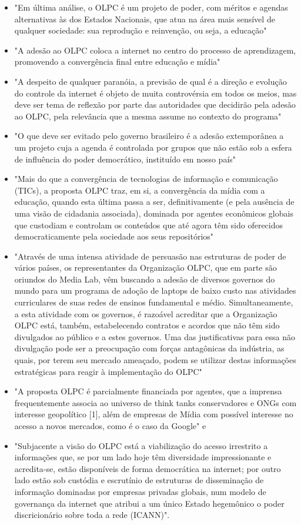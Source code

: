 \begin{itemize}
\item "Em última análise, o OLPC é um projeto de poder, com méritos e agendas alternativas às dos Estados Nacionais, que atua na área mais sensível de qualquer sociedade: sua reprodução e reinvenção, ou seja, a educação"
\item "A adesão ao OLPC coloca a internet no centro do processo de aprendizagem, promovendo a convergência final entre educação e mídia"
\item "A despeito de qualquer paranóia, a previsão de qual é a direção e evolução do controle da internet é objeto de muita controvérsia em todos os meios, mas deve ser tema de reflexão por parte das autoridades que decidirão pela adesão ao OLPC, pela relevância que a mesma assume no contexto do programa"
\item "O que deve ser evitado pelo governo brasileiro é a adesão extemporânea a um projeto cuja a agenda é controlada por grupos que não estão sob a esfera de influência do poder democrático, instituído em nosso país"
\item "Mais do que a convergência de tecnologias de informação e comunicação (TICs), a proposta OLPC traz, em si, a convergência da mídia com a educação, quando esta última passa a ser, definitivamente (e pela ausência de uma visão de cidadania associada), dominada por agentes econômicos globais que custodiam e controlam os conteúdos que até agora têm sido oferecidos democraticamente pela sociedade aos seus repositórios"
\item "Através de uma intensa atividade de persuasão nas estruturas de poder de vários países, os representantes da Organização OLPC, que em parte são oriundos do Media Lab, vêm buscando a adesão de diversos governos do mundo para um programa de adoção de laptops de baixo custo nas atividades curriculares de suas redes de ensinos fundamental e médio. Simultaneamente, a esta atividade com os governos, é razoável acreditar que a Organização OLPC está, também, estabelecendo contratos e acordos que não têm sido divulgados ao público e a estes governos. Uma das justificativas para essa não divulgação pode ser a preocupação com forças antagônicas da indústria, as quais, por terem seu mercado ameaçado, podem se utilizar destas informações estratégicas para reagir à implementação do OLPC"
\item "A proposta OLPC é parcialmente financiada por agentes, que a imprensa frequentemente associa ao universo de think tanks conservadores e ONGs com interesse geopolítico [1], além de empresas de Mídia com possível interesse no acesso a novos mercados, como é o caso da Google" e
\item "Subjacente a visão do OLPC está a viabilização do acesso irrestrito a informações que, se por um lado hoje têm diversidade impressionante e acredita-se, estão disponíveis de forma democrática na internet; por outro lado estão sob custódia e escrutínio de estruturas de disseminação de informação dominadas por empresas privadas globais, num modelo de governança da internet que atribui a um único Estado hegemônico o poder discricionário sobre toda a rede (ICANN)".
\end{itemize}

